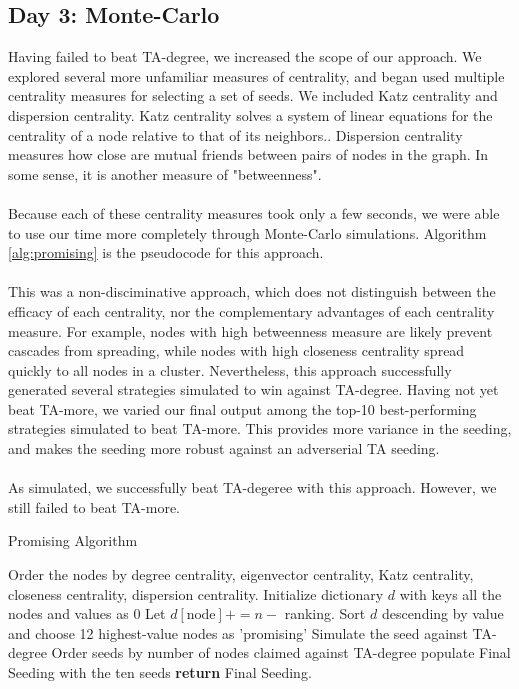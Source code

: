 \documentclass[letterpaper, 11pt]{article}
\begin{document}
\subsection{Day 3: Monte-Carlo}
Having failed to beat TA-degree, we increased the scope of our approach. We explored several more unfamiliar measures of centrality, and began used multiple centrality measures for selecting a set of seeds. We included Katz centrality and dispersion centrality.
Katz centrality solves a system of linear equations for the centrality of a node relative to that of its neighbors.\cite{networkx}.
Dispersion centrality measures how close are mutual friends between pairs of nodes in the graph. \cite{networkx} %
In some sense, it is another measure of "betweenness".
\\\\
Because each of these centrality measures took only a few seconds, we were able to use our time more completely through Monte-Carlo simulations. Algorithm \ref{alg:promising} is the pseudocode for this approach.
\\\\
This was a non-disciminative approach, which does not distinguish between the efficacy of each centrality, nor the complementary advantages of each centrality measure. For example, nodes with high betweenness measure are likely prevent cascades from spreading, while nodes with high closeness centrality spread quickly to all nodes in a cluster. Nevertheless, this approach successfully generated several strategies simulated to win against TA-degree. Having not yet beat TA-more, we varied our final output among the top-10 best-performing strategies simulated to beat TA-more. This provides more variance in the seeding, and makes the seeding more robust against an adverserial TA seeding.
\\\\
As simulated, we successfully beat TA-degeree with this approach. However, we still failed to beat TA-more.

\begin{algorithm}
\caption{Promising Algorithm}
\begin{algorithmic}[1]
\State Order the nodes by degree centrality, eigenvector centrality, Katz centrality, closeness centrality, dispersion centrality.
\State Initialize dictionary $d$ with keys all the nodes and values as 0
\State Let $d[\text{node}] += n - $ ranking.
\EndFor
\EndFor
\State Sort $d$ descending by value and choose 12 highest-value nodes as 'promising'
\State Simulate the seed against TA-degree
\EndFor
\State Order seeds by number of nodes claimed against TA-degree
\State populate Final Seeding with the ten seeds
\EndFor
\EndWhile
\EndProcedure
\State \textbf{return} Final Seeding.
\end{algorithmic}
\label{alg:promising}
\end{algorithm}
\end{document}

